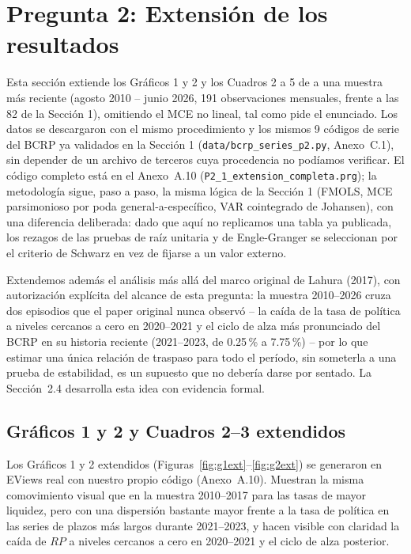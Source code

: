 \documentclass[12pt, letterpaper]{article}
\begin{document}
\clearpage
\section{Pregunta 2: Extensión de los resultados}

Esta sección extiende los Gráficos 1 y 2 y los Cuadros 2 a 5 de
\textcite{lahura2017} a una muestra más reciente (agosto 2010 -- junio
2026, 191 observaciones mensuales, frente a las 82 de la Sección 1),
omitiendo el MCE no lineal, tal como pide el enunciado. Los datos se
descargaron con el mismo procedimiento y los mismos 9 códigos de serie
del BCRP ya validados en la Sección 1 (\texttt{data/bcrp\_series\_p2.py},
Anexo~C.1), sin depender de un archivo de terceros cuya procedencia no
podíamos verificar. El código completo está en el Anexo~A.10
(\texttt{P2\_1\_extension\_completa.prg}); la metodología sigue,
paso a paso, la misma lógica de la Sección 1 (FMOLS, MCE parsimonioso
por poda general-a-específico, VAR cointegrado de Johansen), con una
diferencia deliberada: dado que aquí no replicamos una tabla ya
publicada, los rezagos de las pruebas de raíz unitaria y de
Engle-Granger se seleccionan por el criterio de Schwarz en vez de
fijarse a un valor externo.

Extendemos además el análisis más allá del marco original de Lahura
(2017), con autorización explícita del alcance de esta pregunta: la
muestra 2010--2026 cruza dos episodios que el paper original nunca
observó -- la caída de la tasa de política a niveles cercanos a cero
en 2020--2021 y el ciclo de alza más pronunciado del BCRP en su
historia reciente (2021--2023, de 0.25\,\% a 7.75\,\%) -- por lo que
estimar una única relación de traspaso para todo el período, sin
someterla a una prueba de estabilidad, es un supuesto que no debería
darse por sentado. La Sección~2.4 desarrolla esta idea con evidencia
formal.

\subsection{Gráficos 1 y 2 y Cuadros 2--3 extendidos}

Los Gráficos 1 y 2 extendidos (Figuras~\ref{fig:g1ext}--\ref{fig:g2ext})
se generaron en EViews real con nuestro propio código (Anexo~A.10).
Muestran la misma comovimiento visual que en la muestra 2010--2017 para las tasas de
mayor liquidez, pero con una dispersión bastante mayor frente a la
tasa de política en las series de plazos más largos durante
2021--2023, y hacen visible con claridad la caída de $RP$ a niveles
cercanos a cero en 2020--2021 y el ciclo de alza posterior.
\end{document}
